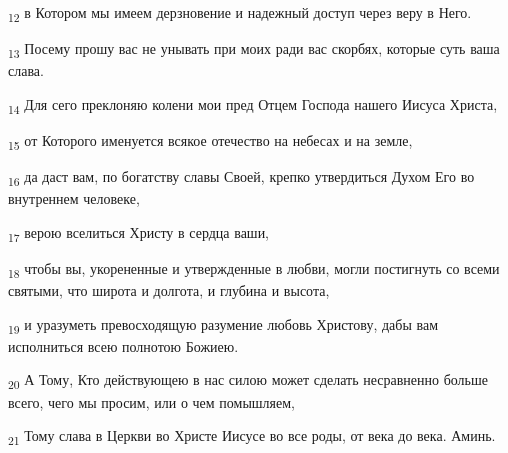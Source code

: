 \begin{tcolorbox}
\textsubscript{12} в Котором мы имеем дерзновение и надежный доступ через веру в Него.
\end{tcolorbox}
\begin{tcolorbox}
\textsubscript{13} Посему прошу вас не унывать при моих ради вас скорбях, которые суть ваша слава.
\end{tcolorbox}
\begin{tcolorbox}
\textsubscript{14} Для сего преклоняю колени мои пред Отцем Господа нашего Иисуса Христа,
\end{tcolorbox}
\begin{tcolorbox}
\textsubscript{15} от Которого именуется всякое отечество на небесах и на земле,
\end{tcolorbox}
\begin{tcolorbox}
\textsubscript{16} да даст вам, по богатству славы Своей, крепко утвердиться Духом Его во внутреннем человеке,
\end{tcolorbox}
\begin{tcolorbox}
\textsubscript{17} верою вселиться Христу в сердца ваши,
\end{tcolorbox}
\begin{tcolorbox}
\textsubscript{18} чтобы вы, укорененные и утвержденные в любви, могли постигнуть со всеми святыми, что широта и долгота, и глубина и высота,
\end{tcolorbox}
\begin{tcolorbox}
\textsubscript{19} и уразуметь превосходящую разумение любовь Христову, дабы вам исполниться всею полнотою Божиею.
\end{tcolorbox}
\begin{tcolorbox}
\textsubscript{20} А Тому, Кто действующею в нас силою может сделать несравненно больше всего, чего мы просим, или о чем помышляем,
\end{tcolorbox}
\begin{tcolorbox}
\textsubscript{21} Тому слава в Церкви во Христе Иисусе во все роды, от века до века. Аминь.
\end{tcolorbox}
